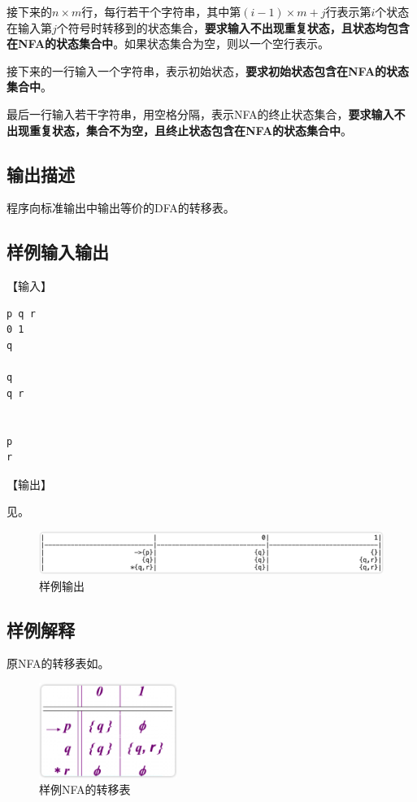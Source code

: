 \documentclass[lang=cn,11pt,a4paper,cite=authornum]{paper}
\begin{document}
接下来的$n\times m$行，每行若干个字符串，其中第$(i-1)\times m+j$行表示第$i$个状态在输入第$j$个符号时转移到的状态集合，\textbf{要求输入不出现重复状态，且状态均包含在NFA的状态集合中}。如果状态集合为空，则以一个空行表示。

接下来的一行输入一个字符串，表示初始状态，\textbf{要求初始状态包含在NFA的状态集合中}。

最后一行输入若干字符串，用空格分隔，表示NFA的终止状态集合，\textbf{要求输入不出现重复状态，集合不为空，且终止状态包含在NFA的状态集合中}。

\subsection{输出描述}

程序向标准输出中输出等价的DFA的转移表。

\subsection{样例输入输出}

【输入】

\begin{listing}[H]
\begin{verbatim}
p q r
0 1
q

q
q r


p
r
\end{verbatim}
\end{listing}

【输出】

见。

\begin{figure}[htbp]

    \centering\includegraphics[width=\textwidth]{./Images/img1.png}

    \caption{样例输出\label{fig:img1}}

\end{figure}

\subsection{样例解释}

原NFA的转移表如。

\begin{figure}[htbp]

    \centering\includegraphics[width=0.4\textwidth]{./Images/img2.png}

    \caption{样例NFA的转移表\label{fig:img2}}


\end{figure}
\end{document}
